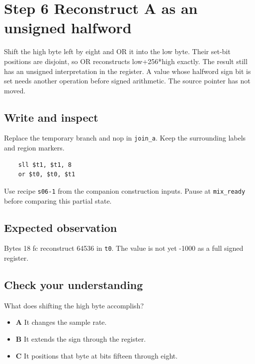 \section{Step 6 Reconstruct A as an unsigned halfword}\label{pcm-s06}

Shift the high byte left by eight and OR it into the low byte. Their set-bit positions are disjoint, so OR reconstructs low+256*high exactly. The result still has an unsigned interpretation in the register. A value whose halfword sign bit is set needs another operation before signed arithmetic. The source pointer has not moved.

\subsection{Write and inspect}
Replace the temporary branch and nop in \texttt{join\_a}. Keep the surrounding labels and region markers.

\begin{verbatim}
    sll $t1, $t1, 8
    or $t0, $t0, $t1
\end{verbatim}
Use recipe \texttt{s06-1} from the companion construction inputs. Pause at \texttt{mix\_ready} before comparing this partial state.

\subsection{Expected observation}
Bytes 18 fc reconstruct 64536 in \texttt{t0}. The value is not yet -1000 as a full signed register.

\subsection{Check your understanding}
What does shifting the high byte accomplish?

\begin{itemize}
  \item \textbf{A} It changes the sample rate.
  \item \textbf{B} It extends the sign through the register.
  \item \textbf{C} It positions that byte at bits fifteen through eight.
\end{itemize}
